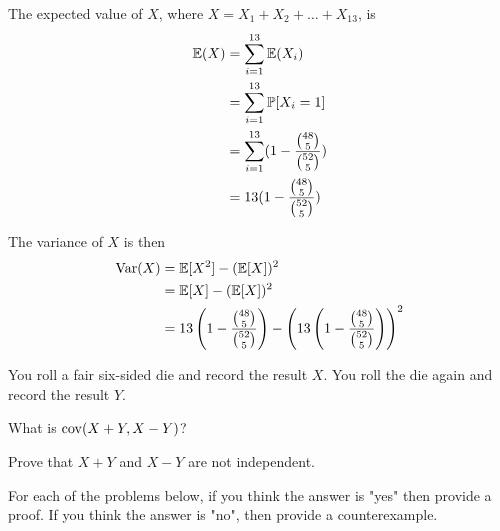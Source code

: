 \documentclass[11pt]{article}
\begin{document}
\begin{solution}
	
\begin{Parts}
		
\Part The expected value of $X$, where $X = X_1 + X_2 + \dots + X_13$, is 
\[
	\begin{split}
		\operatorname{\mathbb{E}}(X) &= \sum_{i=1}^{13} \operatorname{\mathbb{E}}(X_i) \\
		&= \sum_{i=1}^{13} \operatorname{\mathbb{P}}[X_i = 1] \\
		&= \sum_{i=1}^{13} (1 - \frac{\binom{48}{5}}{\binom{52}{5}}) \\
		&= 13 (1 - \frac{\binom{48}{5}}{\binom{52}{5}})
	\end{split}
\]

\Part The variance of $X$ is then 
\[
	\begin{split}
		\operatorname{Var}(X) &= \operatorname{\mathbb{E}}[X^2] - (\operatorname{\mathbb{E}}[X])^2 \\
		&= \operatorname{\mathbb{E}}[X] - (\operatorname{\mathbb{E}}[X])^2 \\
		&= 13 \left( 1 - \frac{\binom{48}{5}}{\binom{52}{5}} \right) - \left(13 \left(1 - \frac{\binom{48}{5}}{\binom{52}{5}}\right) \right)^2 
	\end{split}
\]
	
\end{Parts}
	
\end{solution}	


\begin{Parts}
	\Part You roll a fair six-sided die and record the result $X$. You roll the 
	die again and record the result $Y$.  
	\begin{Parts}
		\item What is $\operatorname{cov} (X+Y, X-Y)$?
		\item Prove that $X+Y$ and $X-Y$ are not independent.
	\end{Parts}

\end{Parts}

For each of the problems below, if you think the answer is "yes" then provide a 
proof. If you think the answer is "no", then provide a counterexample.
\end{document}

